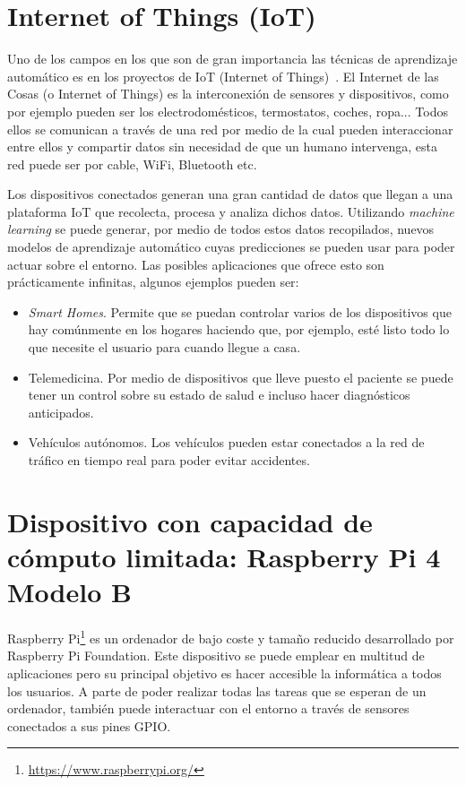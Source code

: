\documentclass[a4paper, 12pt]{book}
\begin{document}
\section{Internet of Things (IoT)}
\label{sec:IoT}

Uno de los campos en los que son de gran importancia las técnicas de aprendizaje automático es en los proyectos de IoT (Internet of Things)~\cite{Rose2015}. El Internet de las Cosas (o Internet of Things) es la interconexión de sensores y dispositivos, como por ejemplo pueden ser los electrodomésticos, termostatos, coches, ropa... Todos ellos se comunican a través de una red por medio de la cual pueden interaccionar entre ellos y compartir datos sin necesidad de que un humano intervenga, esta red puede ser por cable, WiFi, Bluetooth etc. 

Los dispositivos conectados generan una gran cantidad de datos que llegan a una plataforma IoT que recolecta, procesa y analiza dichos datos. Utilizando \textit{machine learning} se puede generar, por medio de todos estos datos recopilados, nuevos modelos de aprendizaje automático cuyas predicciones se pueden usar para poder actuar sobre el entorno. Las posibles aplicaciones que ofrece esto son prácticamente infinitas, algunos ejemplos pueden ser:

\begin{itemize}
    \item \textit{Smart Homes}. Permite que se puedan controlar varios de los dispositivos que hay comúnmente en los hogares haciendo que, por ejemplo, esté listo todo lo que necesite el usuario para cuando llegue a casa.
    \item Telemedicina. Por medio de dispositivos que lleve puesto el paciente se puede tener un control sobre su estado de salud e incluso hacer diagnósticos anticipados.
    \item Vehículos autónomos. Los vehículos pueden estar conectados a la red de tráfico en tiempo real para poder evitar accidentes.
\end{itemize}

\section{Dispositivo con capacidad de cómputo limitada: Raspberry Pi 4 Modelo B}
\label{sec:dispositivo_hardware}

Raspberry Pi\footnote{\url{https://www.raspberrypi.org/}} es un ordenador de bajo coste y tamaño reducido desarrollado por Raspberry Pi Foundation. Este dispositivo se puede emplear en  multitud de aplicaciones pero su principal objetivo es hacer accesible la informática a todos los usuarios. A parte de poder realizar todas las tareas que se esperan de un ordenador, también puede interactuar con el entorno a través de sensores conectados a sus pines GPIO.
\end{document}

